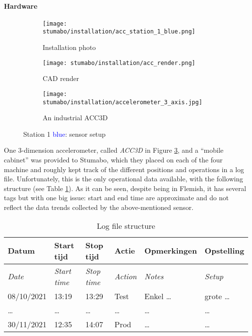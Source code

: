 \paragraph{Hardware} 
\begin{figure}[ht]
    \begin{subfigure}{0.33\textwidth}
        \centering
        \texttt{[image: stumabo/installation/acc\_station\_1\_blue.png]}
        \caption{Installation photo}
        \label{fig:s1b_foto}
    \end{subfigure}
    \begin{subfigure}{0.33\textwidth}
        \centering
        \texttt{[image: stumabo/installation/acc\_render.png]}
        \caption{CAD render}
        \label{fig:s1b_render}
    \end{subfigure}
    \begin{subfigure}{0.32\textwidth}
        \centering
        \texttt{[image: stumabo/installation/accelerometer\_3\_axis.jpg]}
        \caption{An industrial ACC3D}
        \label{fig:stumabo_acc3d}
    \end{subfigure}
    \caption{Station 1 \textcolor{blue}{blue}: sensor setup}
    \label{fig:stu_station1_b}
\end{figure}
One 3-dimension accelerometer, called \textit{ACC3D} in Figure \ref{fig:stumabo_acc3d}, and a ``mobile cabinet'' was provided to Stumabo, 
which they placed on each of the four machine and roughly kept track of the different positions and operations in a log file.
Unfortunately, this is the only operational data available, with the following structure (see Table \ref{tab:stu_logfile}).
As it can be  seen, despite being in Flemish, it has several tags but with one big issue: start and end time are approximate and do not reflect the data trends collected by the above-mentioned sensor.

\begin{table}[h]
    \centering
    \begin{tabularx}{\textwidth}{llllll}
        \toprule
        Datum & Start tijd & Stop tijd & Actie & Opmerkingen & Opstelling \\\midrule
        \textit{Date} & \textit{Start time} & \textit{Stop time} & \textit{Action} & \textit{Notes} & \textit{Setup} \\\midrule
        08/10/2021 & 13:19 & 13:29 & Test & Enkel \dots & grote \dots \\ %
        \midrule
        \dots & \dots & \dots & \dots & \dots & \dots \\\midrule
        30/11/2021 & 12:35 & 14:07 & Prod & \dots & \dots \\\bottomrule
    \end{tabularx}
    \caption{Log file structure}
    \label{tab:stu_logfile}
\end{table}

